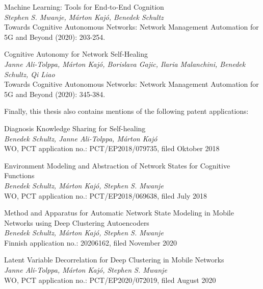 			\begin{publication}
				Machine Learning: Tools for End‐to‐End Cognition \\
				\textit{Stephen S. Mwanje, Márton Kajó, Benedek Schultz} \\
				Towards Cognitive Autonomous Networks: Network Management Automation for 5G and Beyond (2020): 203-254.
			\end{publication}
			
			\begin{publication}
				Cognitive Autonomy for Network Self‐Healing \\
				\textit{Janne Ali-Tolppa, Márton Kajó, Borislava Gajic, Ilaria Malanchini, Benedek Schultz, Qi Liao} \\
				Towards Cognitive Autonomous Networks: Network Management Automation for 5G and Beyond (2020): 345-384.
			\end{publication}
			
			Finally, this thesis also contains mentions of the following patent applications:
						
			\begin{patent}
				Diagnosis Knowledge Sharing for Self-healing \\
				\textit{Benedek Schultz, Janne Ali-Tolppa, Márton Kajó} \\
				WO, PCT application no.: PCT/EP2018/079735, filed Oktober 2018
			\end{patent}
			
			\begin{patent}
				Environment Modeling and Abstraction of Network States for Cognitive Functions \\
				\textit{Benedek Schultz, Márton Kajó, Stephen S. Mwanje} \\
				WO, PCT application no.: PCT/EP2018/069638, filed July 2018
			\end{patent}
			
			\begin{patent}
				Method and Apparatus for Automatic Network State Modeling in Mobile Networks using Deep Clustering Autoencoders \\
				\textit{Benedek Schultz, Márton Kajó, Stephen S. Mwanje} \\
				Finnish application no.: 20206162, filed November 2020
			\end{patent}
		
			\begin{patent}
				Latent Variable Decorrelation for Deep Clustering in Mobile Networks \\
				\textit{Janne Ali-Tolppa, Márton Kajó, Stephen S. Mwanje} \\
				WO, PCT application no.: PCT/EP2020/072019, filed August 2020
			\end{patent}
			
